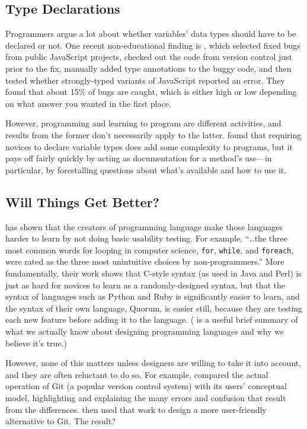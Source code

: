 \subsection*{Type Declarations}

Programmers argue a lot about whether variables' data types should
have to be declared or not.  One recent non-educational finding is
\cite{Gao2017}, which selected fixed bugs from public JavaScript
projects, checked out the code from version control just prior to the
fix, manually added type annotations to the buggy code, and then
tested whether strongly-typed variants of JavaScript reported an
error.  They found that about 15\% of bugs are caught, which is either
high or low depending on what answer you wanted in the first place.

However, programming and learning to program are different activities,
and results from the former don't necessarily apply to the latter.
\cite{Endr2014} found that requiring novices to declare variable types
does add some complexity to programs, but it pays off fairly quickly
by acting as documentation for a method's use---in particular, by
forestalling questions about what's available and how to use it.

\subsection*{Will Things Get Better?}

\cite{Stef2013} has shown that the creators of programming language
make those languages harder to learn by not doing basic usability
testing.  For example, ``{\ldots}the three most common words for
looping in computer science, \texttt{for}, \texttt{while}, and
\texttt{foreach}, were rated as the three most unintuitive choices by
non-programmers.''  More fundamentally, their work shows that C-style
syntax (as used in Java and Perl) is just as hard for novices to learn
as a randomly-designed syntax, but that the syntax of languages such
as Python and Ruby is significantly easier to learn, and the syntax of
their own language, Quorum, is easier still, because they are testing
each new feature before adding it to the language. (\cite{Stef2017} is
a useful brief summary of what we actually know about designing
programming languages and why we believe it's true.)

However, none of this matters unless designers are willing to take it
into account, and they are often reluctant to do so.  For example,
\cite{Pere2013} compared the actual operation of Git (a popular
version control system) with its users' conceptual model, highlighting
and explaining the many errors and confusion that result from the
differences.  \cite{Pere2016} then used that work to design a more
user-friendly alternative to Git.  The result?

